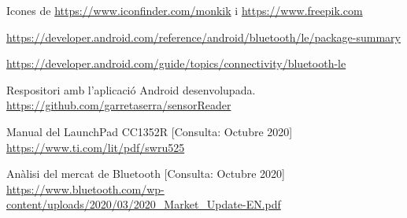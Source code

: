 \begin{thebibliography}{2}
Icones de
\href{https://www.iconfinder.com/monkik}{https://www.iconfinder.com/monkik} i 
\href{https://www.freepik.com}{https://www.freepik.com}

\href{https://developer.android.com/reference/android/bluetooth/le/package-summary}{https://developer.android.com/reference/android/bluetooth/le/package-summary}


\href{https://developer.android.com/guide/topics/connectivity/bluetooth-le}{https://developer.android.com/guide/topics/connectivity/bluetooth-le}

Respositori amb l'aplicació Android desenvolupada. \newline
\href{https://github.com/garretaserra/sensorReader}{https://github.com/garretaserra/sensorReader}

Manual del LaunchPad CC1352R
[Consulta: Octubre 2020] \newline
\href{https://www.ti.com/lit/pdf/swru525}{https://www.ti.com/lit/pdf/swru525}

Anàlisi del mercat de Bluetooth
[Consulta: Octubre 2020] \newline
\href{https://www.bluetooth.com/wp-content/uploads/2020/03/2020\_Market\_Update-EN.pdf}{https://www.bluetooth.com/wp-content/uploads/2020/03/2020\_Market\_Update-EN.pdf}

\end{thebibliography}
